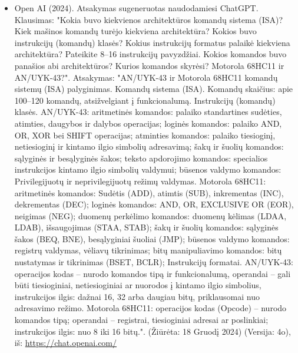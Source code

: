 \documentclass[a4paper,12pt]{article}
\begin{document}
\begin{itemize}
    \item Open AI (2024). Atsakymas sugeneruotas naudodamiesi ChatGPT. Klausimas: "Kokia buvo kiekvienos architektūros komandų sistema (ISA)? Kiek mašinos komandų turėjo kiekviena architektūra? Kokios buvo instrukcijų (komandų) klasės? Kokius instrukcijų formatus palaikė kiekviena architektūra? Pateikite 8–16 instrukcijų pavyzdžiai. Kokios komandos buvo panašios abi architektūros? Kurios komandos skyrėsi? Motorola 68HC11 ir AN/UYK-43?". Atsakymas: "AN/UYK-43 ir Motorola 68HC11 komandų sistemų (ISA) palyginimas. Komandų sistema (ISA). Komandų skaičius: apie 100–120 komandų, atsižvelgiant į funkcionalumą. Instrukcijų (komandų) klasės. AN/UYK-43: aritmetinės komandos: palaiko standartines sudėties, atimties, daugybos ir dalybos operacijas; loginės komandos: palaiko AND, OR, XOR bei SHIFT operacijas; atminties komandos: palaiko tiesioginį, netiesioginį ir kintamo ilgio simbolių adresavimą; šakų ir šuolių komandos: sąlyginės ir besąlyginės šakos; teksto apdorojimo komandos: specialios instrukcijos kintamo ilgio simbolių valdymui; būsenos valdymo komandos: Privilegijuotų ir neprivilegijuotų režimų valdymas. Motorola 68HC11: aritmetinės komandos: Sudėtis (ADD), atimtis (SUB), inkrementas (INC), dekrementas (DEC); loginės komandos: AND, OR, EXCLUSIVE OR (EOR), neigimas (NEG); duomenų perkėlimo komandos: duomenų kėlimas (LDAA, LDAB), išsaugojimas (STAA, STAB); šakų ir šuolių komandos: sąlyginės šakos (BEQ, BNE), besąlyginiai šuoliai (JMP); būsenos valdymo komandos: registrų valdymas, vėliavų tikrinimas; bitų manipuliavimo komandos: bitų nustatymas ir tikrinimas (BSET, BCLR); Instrukcijų formatai. AN/UYK-43: operacijos kodas – nurodo komandos tipą ir funkcionalumą, operandai – gali būti tiesioginiai, netiesioginiai ar nuorodos į kintamo ilgio simbolius, instrukcijos ilgis: dažnai 16, 32 arba daugiau bitų, priklausomai nuo adresavimo režimo. Motorola 68HC11: operacijos kodas (Opcode) – nurodo komandos tipą; operandai – registrai, tiesioginiai adresai ar poslinkiai; instrukcijos ilgis: nuo 8 iki 16 bitų.". (Žiūrėta: 18 Gruodį 2024) (Versija: 4o), iš: \url{https://chat.openai.com/}
\end{itemize}
\end{document}
